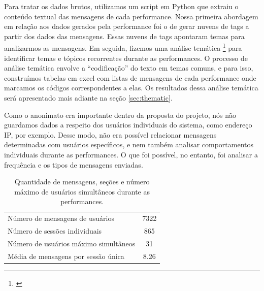 Para tratar os dados brutos, utilizamos um script em Python que extraiu o conteúdo textual das mensagens de cada performance. Nossa primeira abordagem em relação aos dados gerados pela performance foi o de gerar nuvens de tags a partir dos dados das mensagens. Essas nuvens de tags apontaram temas para analizarmos as mensagens. Em seguida, fizemos uma análise temática \footnote{\cite{Braun2006}} para identificar temas e tópicos recorrentes durante as performances. O processo de análise temática envolve a ``codificação'' do texto em temas comuns, e para isso, construímos tabelas em excel com listas de mensagens de cada performance onde marcamos os códigos correspondentes a elas. Os resultados dessa análise temática será apresentado mais adiante na seção \ref{sec:thematic}. 


Como o anonimato era importante dentro da proposta do projeto, nós não guardamos dados a respeito dos usuários individuais do sistema, como endereço IP, por exemplo. Desse modo, não era possível relacionar mensagens determinadas com usuários específicos, e nem também analisar comportamentos individuais durante as performances. O que foi possível, no entanto, foi analisar a frequência e os tipos de mensagens enviadas.


\begin{table}[ht!]
\caption{Quantidade de mensagens, seções e número máximo de usuários simultâneos durante as performances.}{%
\begin{tabular}{@{}lc@{}}\hline
 Número de mensagens de usuários & 7322\\
 Número de sessões individuais & 865\\
 Número de usuários máximo simultâneos & 31\\
 Média de mensagens por sessão única & 8.26\\
\end{tabular}}
\label{tab:overallmsg}
\end{table}

